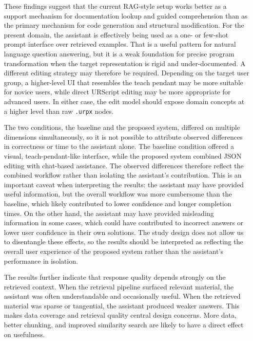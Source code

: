 These findings suggest that the current RAG-style setup works better as a support mechanism for documentation lookup and guided comprehension than as the primary mechanism for code generation and structural modification. For the present domain, the assistant is effectively being used as a one- or few-shot prompt interface over retrieved examples. That is a useful pattern for natural language question answering, but it is a weak foundation for precise program transformation when the target representation is rigid and under-documented. A different editing strategy may therefore be required. Depending on the target user group, a higher-level UI that resembles the teach pendant may be more suitable for novice users, while direct URScript editing may be more appropriate for advanced users. In either case, the edit model should expose domain concepts at a higher level than raw \texttt{.urpx} nodes.

The two conditions, the baseline and the proposed system, differed on multiple dimensions simultaneously, so it is not possible to attribute observed differences in correctness or time to the assistant alone. The baseline condition offered a visual, teach-pendant-like interface, while the proposed system combined JSON editing with chat-based assistance. The observed differences therefore reflect the combined workflow rather than isolating the assistant's contribution. This is an important caveat when interpreting the results: the assistant may have provided useful information, but the overall workflow was more cumbersome than the baseline, which likely contributed to lower confidence and longer completion times. On the other hand, the assistant may have provided misleading information in some cases, which could have contributed to incorrect answers or lower user confidence in their own solutions. The study design does not allow us to disentangle these effects, so the results should be interpreted as reflecting the overall user experience of the proposed system rather than the assistant's performance in isolation.

The results further indicate that response quality depends strongly on the retrieved context. When the retrieval pipeline surfaced relevant material, the assistant was often understandable and occasionally useful. When the retrieved material was sparse or tangential, the assistant produced weaker answers. This makes data coverage and retrieval quality central design concerns. More data, better chunking, and improved similarity search are likely to have a direct effect on usefulness.

